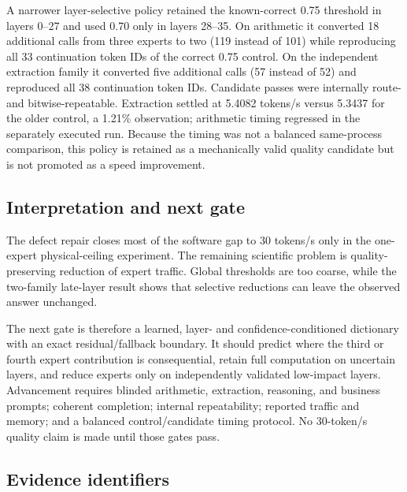 A narrower layer-selective policy retained the known-correct 0.75 threshold in
layers 0--27 and used 0.70 only in layers 28--35.  On arithmetic it converted
18 additional calls from three experts to two (119 instead of 101) while
reproducing all 33 continuation token IDs of the correct 0.75 control.  On the
independent extraction family it converted five additional calls (57 instead
of 52) and reproduced all 38 continuation token IDs.  Candidate passes were
internally route- and bitwise-repeatable.  Extraction settled at 5.4082
tokens/s versus 5.3437 for the older control, a 1.21\% observation; arithmetic
timing regressed in the separately executed run.  Because the timing was not a
balanced same-process comparison, this policy is retained as a mechanically
valid quality candidate but is not promoted as a speed improvement.

\subsection{Interpretation and next gate}

The defect repair closes most of the software gap to 30 tokens/s only in the
one-expert physical-ceiling experiment.  The remaining scientific problem is
quality-preserving reduction of expert traffic.  Global thresholds are too
coarse, while the two-family late-layer result shows that selective reductions
can leave the observed answer unchanged.

The next gate is therefore a learned, layer- and confidence-conditioned
dictionary with an exact residual/fallback boundary.  It should predict where
the third or fourth expert contribution is consequential, retain full
computation on uncertain layers, and reduce experts only on independently
validated low-impact layers.  Advancement requires blinded arithmetic,
extraction, reasoning, and business prompts; coherent completion; internal
repeatability; reported traffic and memory; and a balanced control/candidate
timing protocol.  No 30-token/s quality claim is made until those gates pass.

\subsection{Evidence identifiers}

